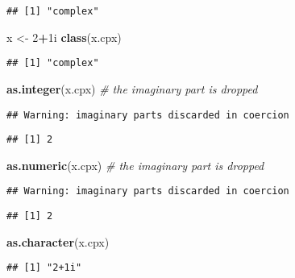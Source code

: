 \documentclass[
  12pt,
]{article}
\newenvironment{Shaded}{\begin{snugshade}}{\end{snugshade}}
\newcommand{\CommentTok}[1]{\textcolor[rgb]{0.56,0.35,0.01}{\textit{#1}}}
\newcommand{\DataTypeTok}[1]{\textcolor[rgb]{0.13,0.29,0.53}{#1}}
\newcommand{\DecValTok}[1]{\textcolor[rgb]{0.00,0.00,0.81}{#1}}
\newcommand{\FunctionTok}[1]{\textcolor[rgb]{0.13,0.29,0.53}{\textbf{#1}}}
\newcommand{\NormalTok}[1]{#1}
\newcommand{\OtherTok}[1]{\textcolor[rgb]{0.56,0.35,0.01}{#1}}
\newcommand{\SpecialCharTok}[1]{\textcolor[rgb]{0.81,0.36,0.00}{\textbf{#1}}}
\begin{document}
\begin{verbatim}
## [1] "complex"
\end{verbatim}

\begin{Shaded}
\begin{Highlighting}[]
\NormalTok{x }\OtherTok{\textless{}{-}} \DecValTok{2}\SpecialCharTok{+}\DecValTok{1}\DataTypeTok{i}
\FunctionTok{class}\NormalTok{(x.cpx)}
\end{Highlighting}
\end{Shaded}

\begin{verbatim}
## [1] "complex"
\end{verbatim}

\begin{Shaded}
\begin{Highlighting}[]
\FunctionTok{as.integer}\NormalTok{(x.cpx)  }\CommentTok{\# the imaginary part is dropped}
\end{Highlighting}
\end{Shaded}

\begin{verbatim}
## Warning: imaginary parts discarded in coercion
\end{verbatim}

\begin{verbatim}
## [1] 2
\end{verbatim}

\begin{Shaded}
\begin{Highlighting}[]
\FunctionTok{as.numeric}\NormalTok{(x.cpx)  }\CommentTok{\# the imaginary part is dropped}
\end{Highlighting}
\end{Shaded}

\begin{verbatim}
## Warning: imaginary parts discarded in coercion
\end{verbatim}

\begin{verbatim}
## [1] 2
\end{verbatim}

\begin{Shaded}
\begin{Highlighting}[]
\FunctionTok{as.character}\NormalTok{(x.cpx)}
\end{Highlighting}
\end{Shaded}

\begin{verbatim}
## [1] "2+1i"
\end{verbatim}
\end{document}
